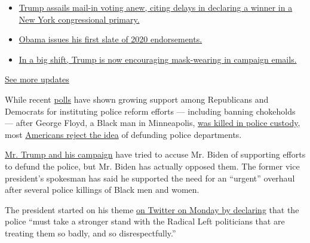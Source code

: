 \begin{itemize}
\tightlist
\item
  \href{https://www.nytimes3xbfgragh.onion/2020/08/03/us/elections/biden-vs-trump.html?action=click\&pgtype=Article\&state=default\&region=MAIN_CONTENT_1\&context=storylines_live_updates\#link-6494b448}{Trump
  assails mail-in voting anew, citing delays in declaring a winner in a
  New York congressional primary.}
\item
  \href{https://www.nytimes3xbfgragh.onion/2020/08/03/us/elections/biden-vs-trump.html?action=click\&pgtype=Article\&state=default\&region=MAIN_CONTENT_1\&context=storylines_live_updates\#link-3de249e6}{Obama
  issues his first slate of 2020 endorsements.}
\item
  \href{https://www.nytimes3xbfgragh.onion/2020/08/03/us/elections/biden-vs-trump.html?action=click\&pgtype=Article\&state=default\&region=MAIN_CONTENT_1\&context=storylines_live_updates\#link-54e34d20}{In
  a big shift, Trump is now encouraging mask-wearing in campaign
  emails.}
\end{itemize}

\href{https://www.nytimes3xbfgragh.onion/2020/08/03/us/elections/biden-vs-trump.html?action=click\&pgtype=Article\&state=default\&region=MAIN_CONTENT_1\&context=storylines_live_updates}{See
more updates}

While recent
\href{https://www.reuters.com/article/us-minneapolis-police-poll-exclusive/exclusive-most-americans-including-republicans-support-sweeping-democratic-police-reform-proposals-reuters-ipsos-poll-idUSKBN23I380}{polls}
have shown growing support among Republicans and Democrats for
instituting police reform efforts --- including banning chokeholds ---
after George Floyd, a Black man in Minneapolis,
\href{https://www.nytimes3xbfgragh.onion/2020/05/31/us/george-floyd-investigation.html}{was
killed in police custody}, most
\href{https://fivethirtyeight.com/features/americans-like-the-ideas-behind-defunding-the-police-more-than-the-slogan-itself/}{Americans
reject the idea} of defunding police departments.

\href{https://apnews.com/afs:Content:9083703494}{Mr. Trump and his
campaign} have tried to accuse Mr. Biden of supporting efforts to defund
the police, but Mr. Biden has actually opposed them. The former vice
president's spokesman has said he supported the need for an ``urgent''
overhaul after several police killings of Black men and women.

The president started on his theme
\href{https://twitter.com/realDonaldTrump/status/1282647375257964544}{on
Twitter on Monday by declaring} that the police ``must take a stronger
stand with the Radical Left politicians that are treating them so badly,
and so disrespectfully.''


